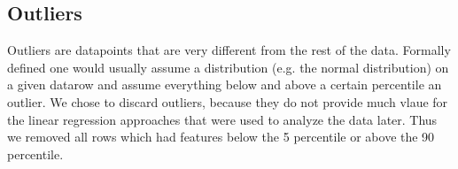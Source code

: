 \subsection{Outliers}
Outliers are datapoints that are very different from the rest of the data. Formally defined one would usually assume a distribution (e.g. the normal distribution) on a given datarow and assume everything below and above a certain percentile an outlier.
 We chose to discard outliers, because they do not provide much vlaue for the linear regression approaches that were used to analyze the data later. Thus we removed all rows which had features below the 5 percentile or above the 90 percentile.\newline

